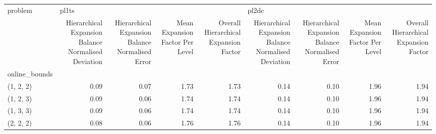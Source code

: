 \begin{tabular}{lrrrrrrrr}
\toprule
problem & \multicolumn{4}{l}{pl1ts} & \multicolumn{4}{l}{pl2dc} \\
{} & Hierarchical Expansion Balance Normalised Deviation & Hierarchical Expansion Balance Normalised Error & Mean Expansion Factor Per Level & Overall Hierarchical Expansion Factor & Hierarchical Expansion Balance Normalised Deviation & Hierarchical Expansion Balance Normalised Error & Mean Expansion Factor Per Level & Overall Hierarchical Expansion Factor \\
online\_bounds &                                                     &                                                 &                                 &                                       &                                                     &                                                 &                                 &                                       \\
\midrule
(1, 2, 2)     &                                               0.09 &                                            0.07 &                            1.73 &                                  1.73 &                                               0.14 &                                            0.10 &                            1.96 &                                  1.94 \\
(1, 2, 3)     &                                               0.09 &                                            0.06 &                            1.74 &                                  1.74 &                                               0.14 &                                            0.10 &                            1.96 &                                  1.94 \\
(1, 3, 3)     &                                               0.09 &                                            0.06 &                            1.74 &                                  1.74 &                                               0.14 &                                            0.10 &                            1.96 &                                  1.94 \\
(2, 2, 2)     &                                               0.08 &                                            0.06 &                            1.76 &                                  1.76 &                                               0.14 &                                            0.10 &                            1.96 &                                  1.94 \\

\end{tabular}
